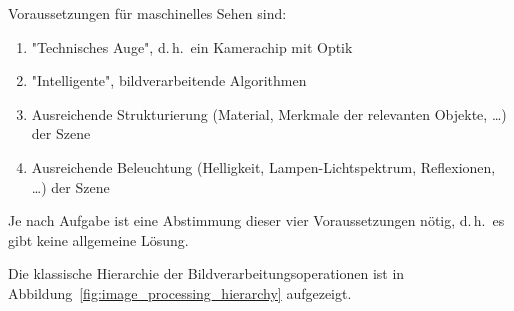 \documentclass[a4paper, 11pt, accentcolor = tud3b]{tudreport}
\renewcommand{\dh}{d.\,h.~}
\begin{document}
				Voraussetzungen für maschinelles Sehen sind:
				\begin{enumerate}
					\item "Technisches Auge", \dh ein Kamerachip mit Optik
					\item "Intelligente", bildverarbeitende Algorithmen
					\item Ausreichende Strukturierung (Material, Merkmale der relevanten Objekte, \dots) der Szene
					\item Ausreichende Beleuchtung (Helligkeit, Lampen-Lichtspektrum, Reflexionen, \dots) der Szene
				\end{enumerate}
				Je nach Aufgabe ist eine Abstimmung dieser vier Voraussetzungen nötig, \dh es gibt keine allgemeine Lösung.
				
				Die klassische Hierarchie der Bildverarbeitungsoperationen ist in Abbildung~\ref{fig:image_processing_hierarchy} aufgezeigt.
				
\end{document}
